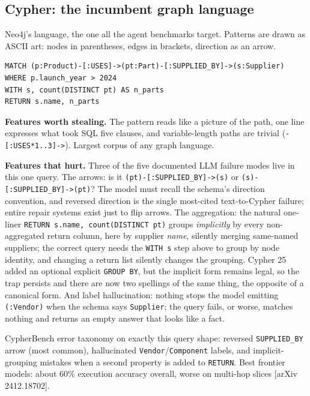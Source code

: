 \documentclass[11pt]{article}
\begin{document}
\subsection{Cypher: the incumbent graph language}

Neo4j's language, the one all the agent benchmarks target. Patterns are drawn as ASCII art: nodes in parentheses, edges in brackets, direction as an arrow.

\begin{lstlisting}[style=old,morekeywords={MATCH,WHERE,WITH,RETURN,count,DISTINCT,AS}]
MATCH (p:Product)-[:USES]->(pt:Part)-[:SUPPLIED_BY]->(s:Supplier)
WHERE p.launch_year > 2024
WITH s, count(DISTINCT pt) AS n_parts
RETURN s.name, n_parts
\end{lstlisting}

\textbf{Features worth stealing.} The pattern reads like a picture of the path, one line expresses what took SQL five clauses, and variable-length paths are trivial (\texttt{-[:USES*1..3]->}). Largest corpus of any graph language.

\textbf{Features that hurt.} Three of the five documented LLM failure modes live in this one query. The arrows: is it \texttt{(pt)-[:SUPPLIED\_BY]->(s)} or \texttt{(s)-[:SUPPLIED\_BY]->(pt)}? The model must recall the schema's direction convention, and reversed direction is the single most-cited text-to-Cypher failure; entire repair systems exist just to flip arrows. The aggregation: the natural one-liner \texttt{RETURN s.name, count(DISTINCT pt)} groups \emph{implicitly} by every non-aggregated return column, here by supplier \emph{name}, silently merging same-named suppliers; the correct query needs the \texttt{WITH s} step above to group by node identity, and changing a return list silently changes the grouping. Cypher 25 added an optional explicit \texttt{GROUP BY}, but the implicit form remains legal, so the trap persists and there are now two spellings of the same thing, the opposite of a canonical form. And label hallucination: nothing stops the model emitting \texttt{(:Vendor)} when the schema says \texttt{Supplier}; the query fails, or worse, matches nothing and returns an empty answer that looks like a fact.

\begin{failbox}
CypherBench error taxonomy on exactly this query shape: reversed \texttt{SUPPLIED\_BY} arrow (most common), hallucinated \texttt{Vendor}/\texttt{Component} labels, and implicit-grouping mistakes when a second property is added to \texttt{RETURN}. Best frontier models: about 60\% execution accuracy overall, worse on multi-hop slices [arXiv 2412.18702].
\end{failbox}
\end{document}

